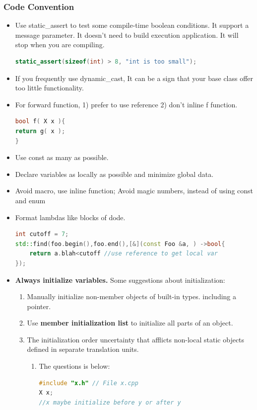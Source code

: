 \documentclass[a4paper,12pt,twoside]{book}
\begin{document}
\subsubsection{Code Convention}
\begin{itemize}

\item Use static\_assert to test some compile-time boolean conditions. It support a message parameter. It doesn't need to build execution application. It will stop when you are compiling.
\begin{lstlisting}[frame=single, language=c++]
static_assert(sizeof(int) > 8, "int is too small");
\end{lstlisting}

\item If you frequently use dynamic\_cast, It can be a sign that your base class offer too little functionality.

\item For forward function, 1) prefer to use reference 2) don't inline f function.
\begin{lstlisting}[frame=single, language=c++]
bool f( X x ){
return g( x );
}
\end{lstlisting}

\item Use const as many as possible.

\item Declare variables as locally as possible and minimize global data.

\item Avoid macro, use inline function;  Avoid magic numbers, instead of using const and enum

\item Format lambdas like blocks of dode.
\begin{lstlisting}[frame=single, language=c++]
int cutoff = 7;
std::find(foo.begin(),foo.end(),[&](const Foo &a, ) ->bool{
    return a.blah<cutoff //use reference to get local var
});
\end{lstlisting}


\item \textbf{Always initialize variables.} Some suggestions about initialization:
\begin{enumerate}
\item Manually initialize non-member objects of built-in types. including a pointer.
\item Use \textbf{member initialization list} to initialize all parts of an object.
\item The initialization order uncertainty that afflicts non-local static objects defined in separate translation units.
\begin{enumerate}
\item The questions is below:
\begin{lstlisting}[frame=single, language=c++]
#include "x.h" // File x.cpp
X x;
//x maybe initialize before y or after y


\end{lstlisting}
\end{enumerate}
\end{enumerate}
\end{itemize}
\end{document}
